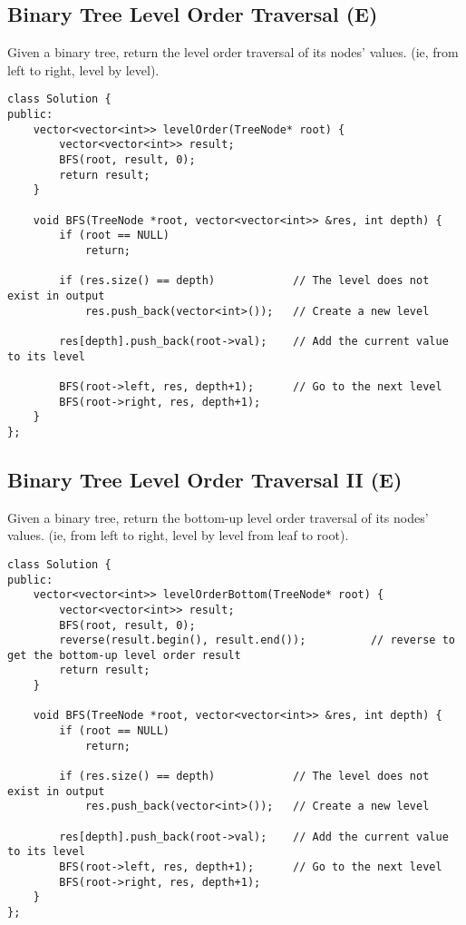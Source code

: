 \subsection{Binary Tree Level Order Traversal (E)}
Given a binary tree, return the level order traversal of its nodes' values. (ie, from left to right, level by level).\\

\begin{lstlisting}
class Solution {
public:
    vector<vector<int>> levelOrder(TreeNode* root) {
        vector<vector<int>> result;
        BFS(root, result, 0);
        return result;
    }
    
    void BFS(TreeNode *root, vector<vector<int>> &res, int depth) {
        if (root == NULL)
            return;
        
        if (res.size() == depth)            // The level does not exist in output
            res.push_back(vector<int>());   // Create a new level
            
        res[depth].push_back(root->val);    // Add the current value to its level
        
        BFS(root->left, res, depth+1);      // Go to the next level
        BFS(root->right, res, depth+1);
    }
};
\end{lstlisting}


\subsection{Binary Tree Level Order Traversal II (E)}
Given a binary tree, return the bottom-up level order traversal of its nodes' values. (ie, from left to right, level by level from leaf to root).\\

\begin{lstlisting}
class Solution {
public:
    vector<vector<int>> levelOrderBottom(TreeNode* root) {
        vector<vector<int>> result;
        BFS(root, result, 0);
        reverse(result.begin(), result.end());          // reverse to get the bottom-up level order result
        return result;
    }
    
    void BFS(TreeNode *root, vector<vector<int>> &res, int depth) {
        if (root == NULL)
            return;
        
        if (res.size() == depth)            // The level does not exist in output
            res.push_back(vector<int>());   // Create a new level
            
        res[depth].push_back(root->val);    // Add the current value to its level
        BFS(root->left, res, depth+1);      // Go to the next level
        BFS(root->right, res, depth+1);
    }
};
\end{lstlisting}


